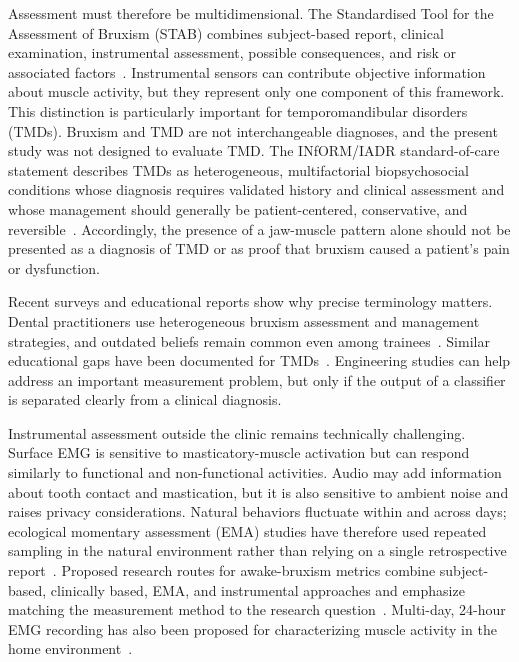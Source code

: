 \documentclass[pdflatex,sn-nature,iicol]{sn-jnl}
\begin{document}
\color{blue}
Assessment must therefore be multidimensional. The Standardised Tool for the Assessment of Bruxism (STAB) combines subject-based report, clinical examination, instrumental assessment, possible consequences, and risk or associated factors~\cite{manfredini2024standardised}. Instrumental sensors can contribute objective information about muscle activity, but they represent only one component of this framework. This distinction is particularly important for temporomandibular disorders (TMDs). Bruxism and TMD are not interchangeable diagnoses, and the present study was not designed to evaluate TMD. The INfORM/IADR standard-of-care statement describes TMDs as heterogeneous, multifactorial biopsychosocial conditions whose diagnosis requires validated history and clinical assessment and whose management should generally be patient-centered, conservative, and reversible~\cite{inform2025tmd}. Accordingly, the presence of a jaw-muscle pattern alone should not be presented as a diagnosis of TMD or as proof that bruxism caused a patient's pain or dysfunction.
\color{black}

\color{blue}
Recent surveys and educational reports show why precise terminology matters. Dental practitioners use heterogeneous bruxism assessment and management strategies, and outdated beliefs remain common even among trainees~\cite{mungia2025approaches,nasanen2026competence}. Similar educational gaps have been documented for TMDs~\cite{sangalli2026education}. Engineering studies can help address an important measurement problem, but only if the output of a classifier is separated clearly from a clinical diagnosis.
\color{black}

\color{blue}
Instrumental assessment outside the clinic remains technically challenging. Surface EMG is sensitive to masticatory-muscle activation but can respond similarly to functional and non-functional activities. Audio may add information about tooth contact and mastication, but it is also sensitive to ambient noise and raises privacy considerations. Natural behaviors fluctuate within and across days; ecological momentary assessment (EMA) studies have therefore used repeated sampling in the natural environment rather than relying on a single retrospective report~\cite{bracci2018frequency,colonna2025fluctuation}. Proposed research routes for awake-bruxism metrics combine subject-based, clinically based, EMA, and instrumental approaches and emphasize matching the measurement method to the research question~\cite{bracci2024metrics}. Multi-day, 24-hour EMG recording has also been proposed for characterizing muscle activity in the home environment~\cite{colonna2023electromyographic}.
\color{black}
\end{document}
